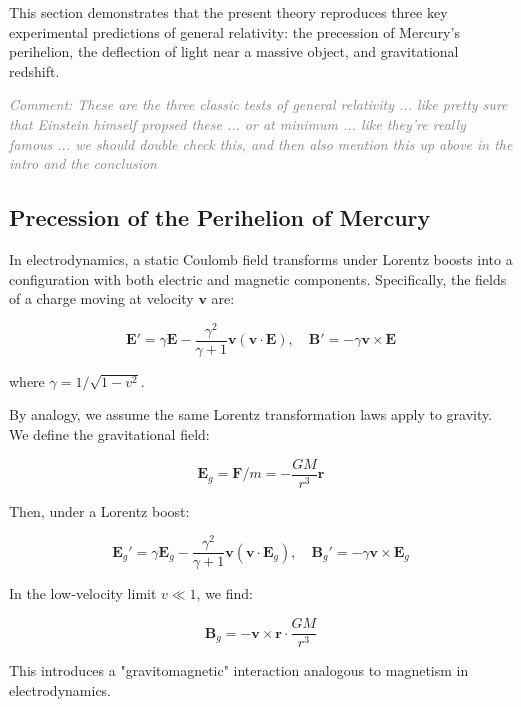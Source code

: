 \documentclass {article}
\renewcommand\vec{\mathbf}
\newcommand{\comment}[1]{\textcolor{gray}{\small\textit{Comment: #1}}}
\begin{document}
This section demonstrates that the present theory reproduces three key experimental predictions of general relativity: the precession of Mercury's perihelion, the deflection of light near a massive object, and gravitational redshift. 

\comment{These are the three classic tests of general relativity ... like pretty sure that Einstein himself propsed these ... or at minimum ... like they're really famous ... we should double check this, and then also mention this up above in the intro and the conclusion} 

\subsection{Precession of the Perihelion of Mercury}

In electrodynamics, a static Coulomb field transforms under Lorentz boosts into a configuration with both electric and magnetic components. Specifically, the fields of a charge moving at velocity \( \vec{v} \) are:

\begin{equation}
\vec{E}' = \gamma \vec{E} - \frac{\gamma^2}{\gamma + 1} \vec{v} (\vec{v} \cdot \vec{E}), \quad
\vec{B}' = - \gamma \vec{v} \times \vec{E}
\end{equation}

where \( \gamma = 1 / \sqrt{1 - v^2} \).

By analogy, we assume the same Lorentz transformation laws apply to gravity. We define the gravitational field:

\begin{equation}
\vec{E}_g = \vec{F} / m = - \frac{G M}{r^3} \vec{r}
\end{equation}

Then, under a Lorentz boost:

\begin{equation}
\vec{E}_g' = \gamma \vec{E}_g - \frac{\gamma^2}{\gamma + 1} \vec{v} (\vec{v} \cdot \vec{E}_g), \quad
\vec{B}_g' = -\gamma \vec{v} \times \vec{E}_g
\end{equation}

In the low-velocity limit \( v \ll 1 \), we find:

\begin{equation}
\vec{B}_g = - \vec{v} \times \vec{r} \cdot \frac{GM}{r^3}
\end{equation}

This introduces a "gravitomagnetic" interaction analogous to magnetism in electrodynamics.
\end{document}
